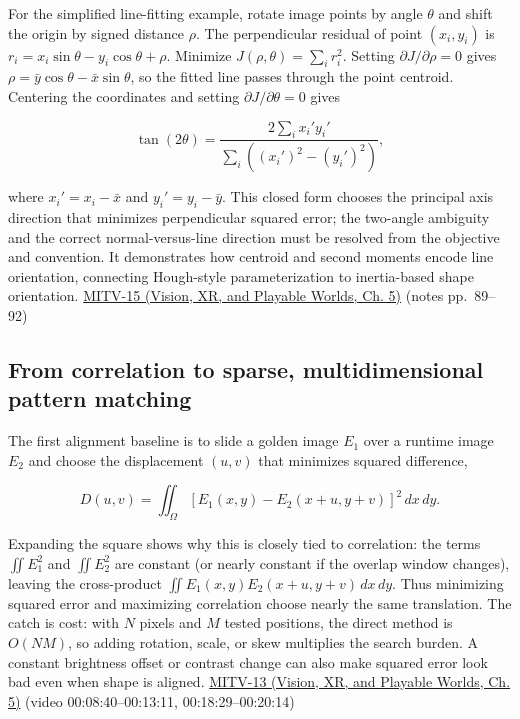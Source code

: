 For the simplified line-fitting example, rotate image points by angle \(\theta\) and shift the origin by signed distance \(\rho\). The perpendicular residual of point \((x_i,y_i)\) is \(r_i=x_i\sin\theta-y_i\cos\theta+\rho\). Minimize \(J(\rho,\theta)=\sum_i r_i^2\). Setting \(\partial J/\partial\rho=0\) gives \(\rho=\bar{y}\cos\theta-\bar{x}\sin\theta\), so the fitted line passes through the point centroid. Centering the coordinates and setting \(\partial J/\partial\theta=0\) gives

\[
\tan(2\theta)=\frac{2\sum_i x_i'y_i'}{\sum_i((x_i')^2-(y_i')^2)},
\]

where \(x_i'=x_i-\bar{x}\) and \(y_i'=y_i-\bar{y}\). This closed form chooses the principal axis direction that minimizes perpendicular squared error; the two-angle ambiguity and the correct normal-versus-line direction must be resolved from the objective and convention. It demonstrates how centroid and second moments encode line orientation, connecting Hough-style parameterization to inertia-based shape orientation. \href{../07-Vision-XR-and-Playable-Worlds/main.pdf\#nameddest=04-visual-computing-ii-ch036-mitv-15---alignment-patmax-distance-field-filtering-and-sub-sampling-us-7065262}{MITV-15 (Vision, XR, and Playable Worlds, Ch. 5)} (notes pp.~89--92)

\subsection{From correlation to sparse, multidimensional pattern matching}\label{04-visual-computing-ii-ch030-from-correlation-to-sparse-multidimensional-pattern-matching}

\hypertarget{04-visual-computing-ii-ch030-from-correlation-to-sparse-multidimensional-pattern-matching}{}

The first alignment baseline is to slide a golden image \(E_1\) over a runtime image \(E_2\) and choose the displacement \((u,v)\) that minimizes squared difference,

\[
D(u,v)=\iint_\Omega [E_1(x,y)-E_2(x+u,y+v)]^2\,dx\,dy.
\]

Expanding the square shows why this is closely tied to correlation: the terms \(\iint E_1^2\) and \(\iint E_2^2\) are constant (or nearly constant if the overlap window changes), leaving the cross-product \(\iint E_1(x,y)E_2(x+u,y+v)\,dx\,dy\). Thus minimizing squared error and maximizing correlation choose nearly the same translation. The catch is cost: with \(N\) pixels and \(M\) tested positions, the direct method is \(O(NM)\), so adding rotation, scale, or skew multiplies the search burden. A constant brightness offset or contrast change can also make squared error look bad even when shape is aligned. \href{../07-Vision-XR-and-Playable-Worlds/main.pdf\#nameddest=04-visual-computing-ii-ch036-mitv-13---object-detection-recognition-and-pose-determination-patquick-us-7016539}{MITV-13 (Vision, XR, and Playable Worlds, Ch. 5)} (video 00:08:40--00:13:11, 00:18:29--00:20:14)


